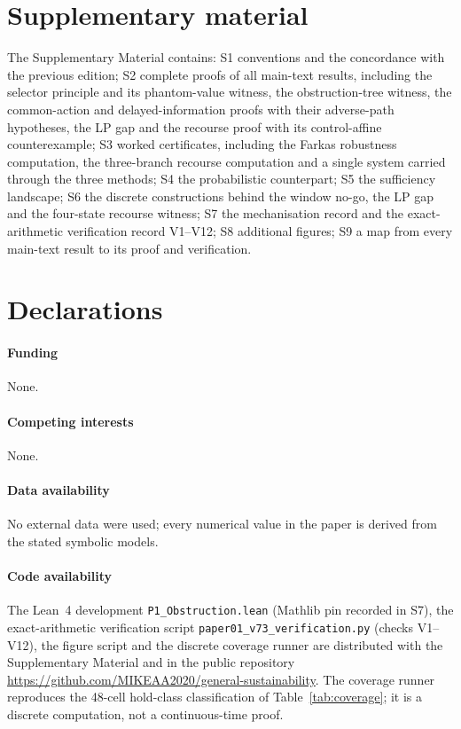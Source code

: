 \documentclass[11pt,a4paper]{article}
\theoremstyle{plain}
\theoremstyle{definition}
\theoremstyle{remark}
\begin{document}
\section*{Supplementary material}
The Supplementary Material contains: S1 conventions and the concordance with the previous edition; S2 complete proofs of all main-text results, including the selector principle and its phantom-value witness, the obstruction-tree witness, the common-action and delayed-information proofs with their adverse-path hypotheses, the LP gap and the recourse proof with its control-affine counterexample; S3 worked certificates, including the Farkas robustness computation, the three-branch recourse computation and a single system carried through the three methods; S4 the probabilistic counterpart; S5 the sufficiency landscape; S6 the discrete constructions behind the window no-go, the LP gap and the four-state recourse witness; S7 the mechanisation record and the exact-arithmetic verification record V1--V12; S8 additional figures; S9 a map from every main-text result to its proof and verification.

\section*{Declarations}
\paragraph{Funding} None.
\paragraph{Competing interests} None.
\paragraph{Data availability} No external data were used; every numerical value in the paper is derived from the stated symbolic models.
\paragraph{Code availability} The Lean~4 development \texttt{P1\_Obstruction.lean} (Mathlib pin recorded in S7), the exact-arithmetic verification script \texttt{paper01\_v73\_verification.py} (checks V1--V12), the figure script and the discrete coverage runner are distributed with the Supplementary Material and in the public repository \url{https://github.com/MIKEAA2020/general-sustainability}. The coverage runner reproduces the 48-cell hold-class classification of Table~\ref{tab:coverage}; it is a discrete computation, not a continuous-time proof.
\end{document}
